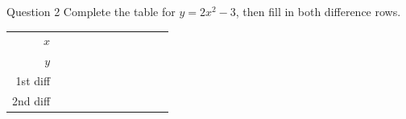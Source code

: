 \documentclass[11pt]{article}
\begin{document}
\begin{qbox}{Question 2}
Complete the table for $y=2x^2-3$, then fill in both difference rows.
\begin{center}\renewcommand{\arraystretch}{1.15}\setlength{\tabcolsep}{2pt}\begin{tabular}{r|>{\centering\arraybackslash}p{0.62cm}>{\centering\arraybackslash}p{0.62cm}>{\centering\arraybackslash}p{0.62cm}>{\centering\arraybackslash}p{0.62cm}>{\centering\arraybackslash}p{0.62cm}>{\centering\arraybackslash}p{0.62cm}>{\centering\arraybackslash}p{0.62cm}>{\centering\arraybackslash}p{0.62cm}>{\centering\arraybackslash}p{0.62cm}>{\centering\arraybackslash}p{0.62cm}}
$x$ & \multicolumn{2}{c}{\colorbox{iagreen}{\makebox[1.12cm]{\strut \color{white}\bfseries $-2$}}} & \multicolumn{2}{c}{\colorbox{iagreen}{\makebox[1.12cm]{\strut \color{white}\bfseries $-1$}}} & \multicolumn{2}{c}{\colorbox{iagreen}{\makebox[1.12cm]{\strut \color{white}\bfseries $0$}}} & \multicolumn{2}{c}{\colorbox{iagreen}{\makebox[1.12cm]{\strut \color{white}\bfseries $1$}}} & \multicolumn{2}{c}{\colorbox{iagreen}{\makebox[1.12cm]{\strut \color{white}\bfseries $2$}}} \\[2pt]
$y$ & \multicolumn{2}{c}{\fbox{\makebox[0.94cm]{\strut}}} & \multicolumn{2}{c}{\fbox{\makebox[0.94cm]{\strut}}} & \multicolumn{2}{c}{\fbox{\makebox[0.94cm]{\strut}}} & \multicolumn{2}{c}{\fbox{\makebox[0.94cm]{\strut}}} & \multicolumn{2}{c}{\fbox{\makebox[0.94cm]{\strut}}} \\[2pt]
\textcolor{exblue}{\scriptsize 1st diff} & & \multicolumn{2}{c}{\fbox{\makebox[0.94cm]{\strut}}} & \multicolumn{2}{c}{\fbox{\makebox[0.94cm]{\strut}}} & \multicolumn{2}{c}{\fbox{\makebox[0.94cm]{\strut}}} & \multicolumn{2}{c}{\fbox{\makebox[0.94cm]{\strut}}} & \\[2pt]
\textcolor{qorange}{\scriptsize 2nd diff} & & & \multicolumn{2}{c}{\fbox{\makebox[0.94cm]{\strut}}} & \multicolumn{2}{c}{\fbox{\makebox[0.94cm]{\strut}}} & \multicolumn{2}{c}{\fbox{\makebox[0.94cm]{\strut}}} & & \\
\end{tabular}\end{center}\workspace{1.2cm}
\end{qbox}
\end{document}
